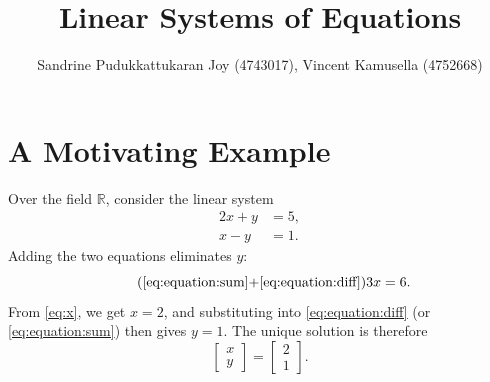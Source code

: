 \documentclass{article}
\title{Linear Systems of Equations}
\author{Sandrine Pudukkattukaran Joy (4743017), Vincent Kamusella (4752668)}
\begin{document}
\maketitle

\section{A Motivating Example}
\label{sec:example}
Over the field $\mathbb{R}$, consider the linear system
\begin{subequations}
	\label{eq:system}
	\begin{align}
		2x + y & = 5, \label{eq:equation:sum}\\
		x - y & = 1. \label{eq:equation:diff}
	\end{align}
\end{subequations}
Adding the two equations eliminates $y$:
\begin{equation}
	\label{eq:x}
	\tag{\ref{eq:equation:sum}+\ref{eq:equation:diff}}
	3x = 6.
\end{equation}
From \eqref{eq:x}, we get $x = 2$, and substituting into \eqref{eq:equation:diff} (or \eqref{eq:equation:sum}) then gives $y = 1$.
The unique solution is therefore
\begin{equation*}
	\begin{bmatrix}
		x \\ y
	\end{bmatrix}
	=
	\begin{bmatrix}
		2 \\ 1
	\end{bmatrix}.
\end{equation*}
\end{document}

